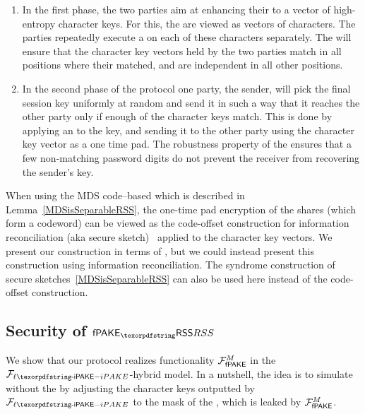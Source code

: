 

% 
\begin{enumerate}
\item 
In the first phase, the two parties aim at enhancing their \passwords to a vector of high-entropy character keys. 
For this, the \passwords are viewed as vectors of characters. 
The parties repeatedly execute a \PAKE on each of these characters separately. 
The \PAKE will ensure that the character key vectors held by the two parties match in all positions where their \passwords matched, and are independent in all other positions. 
\item
In the second phase of the protocol one party, the sender, will pick the final session key uniformly at random and send it in such a way that it reaches the other party only if enough of the character keys match.
This is done by applying an \RSS to the key, and sending it to the other party using the character key vector as a one time pad.
The robustness property of the \RSS ensures that a few non-matching password digits do not prevent the receiver from recovering the sender's key.
\end{enumerate}

When using the MDS code--based \RSS which is described in Lemma~\ref{MDSisSeparableRSS}, the one-time pad encryption of the shares (which form a codeword) can be viewed as the code-offset construction for information reconciliation (aka secure sketch)~\cite{CCS:JueWat99,EC:DodReySmi04} applied to the character key vectors. 
We present our construction in terms of \RSS, but we could instead present this construction using information reconciliation. 
The syndrome construction of secure sketches~\ref{MDSisSeparableRSS} can also be used here instead of the code-offset construction.

\subsection{Security of {$\PfakeRSS$}} 
We show that our protocol realizes functionality $\mathcal{F}_\textsf{fPAKE}^M$ in the $\Flipake$-hybrid model. In a nutshell, the idea is to simulate without the \passwords by adjusting the character keys outputted by $\Flipake$ to the mask of the \passwords, which is leaked by $\mathcal{F}_\textsf{fPAKE}^M$. 

